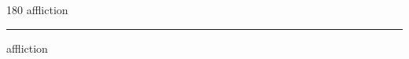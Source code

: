 
\begin{frame}
\begin{center}
\begin{turn}{180}
{\fontsize{2.5cm}{1em}\selectfont affliction}
\end{turn}
\vspace{1em}\par  
\hrule
\vspace{1em}\par  
{\fontsize{2.5cm}{1em}\selectfont affliction}
\end{center}
\end{frame}
